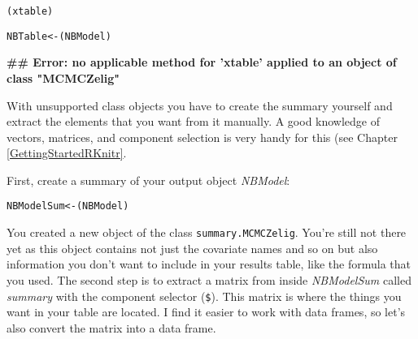 \begin{knitrout}
\color{fgcolor}\begin{kframe}
\begin{alltt}
(xtable)

NBTable <- (NBModel)
\end{alltt}


{\ttfamily\noindent\bfseries\textcolor{errorcolor}{\#\# Error: no applicable method for 'xtable' applied to an object of class "MCMCZelig"}}\end{kframe}
\end{knitrout}


With unsupported class objects you have to create the summary yourself and extract the elements that you want from it manually. A good knowledge of vectors, matrices, and component selection is very handy for this (see Chapter \ref{GettingStartedRKnitr}. 

First, create a summary of your output object {\emph{NBModel}}:

\begin{knitrout}
\color{fgcolor}\begin{kframe}
\begin{alltt}
NBModelSum <- (NBModel)
\end{alltt}
\end{kframe}
\end{knitrout}


You created a new object of the class {\tt{summary.MCMCZelig}}. You're still not there yet as this object contains not just the covariate names and so on but also information you don't want to include in your results table, like the formula that you used. The second step is to extract a matrix from inside {\emph{NBModelSum}} called {\emph{summary}} with the component selector ({\tt{\$}}). This matrix is where the things you want in your table are located. I find it easier to work with data frames, so let's also convert the matrix into a data frame.

\begin{knitrout}
\color{fgcolor}
\end{knitrout}

